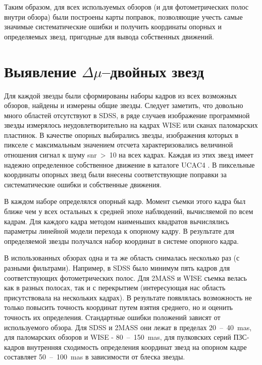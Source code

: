 Таким образом, для всех используемых обзоров (и для фотометрических полос внутри обзора) были построены карты поправок, позволяющие учесть самые значимые систематические ошибки и получить координаты опорных и определяемых звезд, пригодные для вывода собственных движений.
\section{Выявление $\Delta\mu$--двойных звезд} \label{sec:ch3/sect3}
Для каждой звезды были сформированы наборы кадров из всех возможных обзоров, найдены и измерены общие звезды. Следует заметить, что довольно много областей отсутствуют в SDSS, в ряде случаев изображение программной звезды измерялось неудовлетворительно на кадрах WISE или сканах паломарских пластинок. В качестве опорных выбирались звезды, изображения которых в пикселе с максимальным значением отсчета характеризовались величиной отношения сигнал к шуму snr~>~10 на всех кадрах. Каждая из этих звезд имеет надежно определенное собственное движение в каталоге UCAC4 . В пиксельные координаты опорных звезд были внесены соответствующие поправки за систематические ошибки и собственные движения.

В каждом наборе определялся опорный кадр. Момент съемки этого кадра был ближе чем у всех остальных к средней эпохе наблюдений, вычисляемой по всем кадрам. Для каждого кадра методом наименьших квадратов вычислялись параметры линейной модели перехода к опорному кадру. В результате для определяемой звезды получался набор координат в системе опорного кадра.

В использованных обзорах одна и та же область снималась несколько раз (с разными фильтрами). Например, в SDSS было минимум пять кадров для соответствующих фотометрических полос. Для 2MASS и WISE съемка велась как в разных полосах, так и с перекрытием (интересующая нас область присутствовала на нескольких кадрах). В результате появлялась возможность не только повысить точность координат путем взятия среднего, но и оценить точность их определения. Стандартные ошибки положений зависят от используемого обзора. Для SDSS и 2MASS они лежат в пределах 20~--~40~mas, для паломарских обзоров и WISE  - 80~--~150~mas, для пулковских серий ПЗС-кадров внутренняя сходимость определения координат звезд на опорном кадре составляет 50~--~100~mas в зависимости от блеска звезды.

